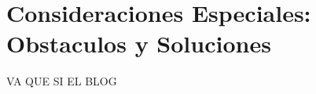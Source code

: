 \chapter{Consideraciones Especiales: Obstaculos y Soluciones} \label{chapter:consideraciones}

VA QUE SI EL BLOG